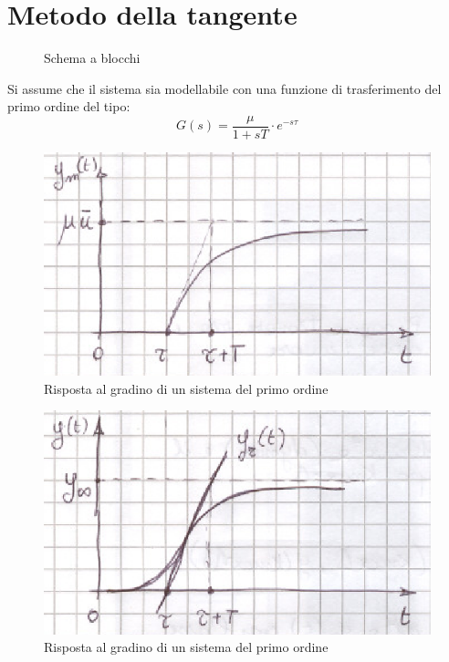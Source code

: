 \documentclass[a4paper]{report}
\begin{document}
\section{Metodo della tangente}
\begin{figure}[!hbp]
  \center
  \caption{Schema a blocchi}
  \label{fig:schemaABlocchi}
\end{figure}
Si assume che il sistema sia modellabile con una funzione di
trasferimento del primo ordine del tipo:
\[
G(s) = \dfrac{\mu}{1 + sT} \cdot e^{-s\tau}
\]
\begin{figure}[!hbp]
  \begin{center}
    \includegraphics[scale=0.5]{./figures/metodoTangente01.png}
    \caption{Risposta al gradino di un sistema del primo ordine}
    \label{fig:rispostaGradino1Ordine}
  \end{center}
\end{figure}
\begin{figure}[!hbp]
  \begin{center}
    \includegraphics[scale=0.5]{./figures/metodoTangente02.png}
    \caption{Risposta al gradino di un sistema del primo ordine}
    \label{fig:rispostaGradino1Ordineyr}
  \end{center}
\end{figure}
\end{document}
